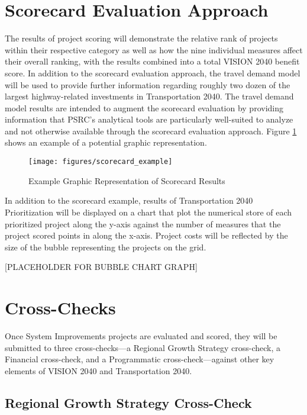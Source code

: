 \documentclass[10pt, letterpaper, final, twoside, onecolumn]{memoir}%
\begin{document}
\section{Scorecard Evaluation Approach}

The results of project scoring will demonstrate the relative rank of projects within their respective category as well as how the nine individual measures affect their overall ranking, with the results combined into a total VISION 2040 benefit score. In addition to the scorecard evaluation approach, the travel demand model will be used to provide further information regarding roughly two dozen of the largest highway-related investments in Transportation 2040. The travel demand model results are intended to augment the scorecard evaluation by providing information that PSRC’s analytical tools are particularly well-suited to analyze and not otherwise available through the scorecard evaluation approach. Figure \ref{fg:scexample} shows an example of a potential graphic representation.

\begin{figure}[htbp]
\begin{center}
\texttt{[image: figures/scorecard\_example]}
\caption{Example Graphic Representation of Scorecard Results}
\label{fg:scexample}
\end{center}
\end{figure}

In addition to the scorecard example, results of Transportation 2040 Prioritization will be displayed on a chart that plot the numerical store of each prioritized project along the y-axis against the number of measures that the project scored points in along the x-axis. Project costs will be reflected by the size of the bubble representing the projects on the grid.

[PLACEHOLDER FOR BUBBLE CHART GRAPH]

\section{Cross-Checks}
Once System Improvements projects are evaluated and scored, they will be submitted to three cross-checks---a Regional Growth Strategy cross-check, a Financial cross-check, and a Programmatic cross-check---against other key elements of VISION 2040 and Transportation 2040.

\subsection{Regional Growth Strategy Cross-Check}
\end{document}
